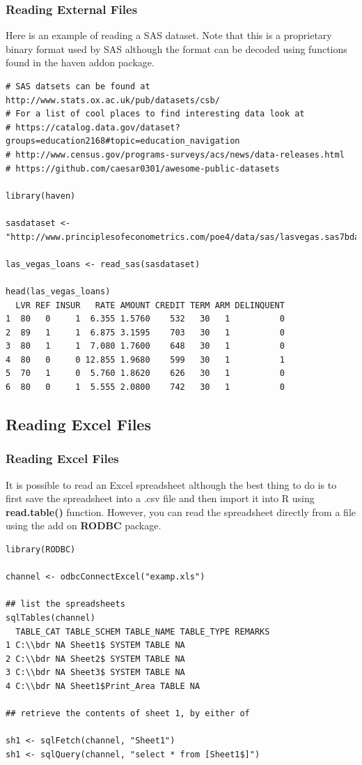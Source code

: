 \documentclass{beamer}
\begin{document}
\begin{frame}[fragile]
\frametitle{Reading External Files}
Here is an example of reading a SAS dataset. Note that this is a proprietary binary format used
by SAS although the format can be decoded using functions found in the haven addon package. 
\newline
\tiny
\begin{verbatim}
# SAS datsets can be found at http://www.stats.ox.ac.uk/pub/datasets/csb/
# For a list of cool places to find interesting data look at 
# https://catalog.data.gov/dataset?groups=education2168#topic=education_navigation
# http://www.census.gov/programs-surveys/acs/news/data-releases.html
# https://github.com/caesar0301/awesome-public-datasets

library(haven)

sasdataset <- "http://www.principlesofeconometrics.com/poe4/data/sas/lasvegas.sas7bdat"

las_vegas_loans <- read_sas(sasdataset)

head(las_vegas_loans)
  LVR REF INSUR   RATE AMOUNT CREDIT TERM ARM DELINQUENT
1  80   0     1  6.355 1.5760    532   30   1          0
2  89   1     1  6.875 3.1595    703   30   1          0
3  80   1     1  7.080 1.7600    648   30   1          0
4  80   0     0 12.855 1.9680    599   30   1          1
5  70   1     0  5.760 1.8620    626   30   1          0
6  80   0     1  5.555 2.0800    742   30   1          0

\end{verbatim}
\end{frame}
%

\subsection{Reading Excel Files}
\begin{frame}[fragile]
\frametitle{Reading Excel Files}
It is possible to read an Excel spreadsheet although the best thing to do is to first save the spreadsheet into a .csv file and then import it into R using \textbf{read.table()} function.
However, you can read the spreadsheet directly from a file using the add on \textbf{RODBC} package.
\footnotesize
\begin{verbatim}
library(RODBC)

channel <- odbcConnectExcel("examp.xls")

## list the spreadsheets
sqlTables(channel)
  TABLE_CAT TABLE_SCHEM TABLE_NAME TABLE_TYPE REMARKS
1 C:\\bdr NA Sheet1$ SYSTEM TABLE NA
2 C:\\bdr NA Sheet2$ SYSTEM TABLE NA
3 C:\\bdr NA Sheet3$ SYSTEM TABLE NA
4 C:\\bdr NA Sheet1$Print_Area TABLE NA

## retrieve the contents of sheet 1, by either of

sh1 <- sqlFetch(channel, "Sheet1")
sh1 <- sqlQuery(channel, "select * from [Sheet1$]")
\end{verbatim}
\end{frame}
\end{document}
